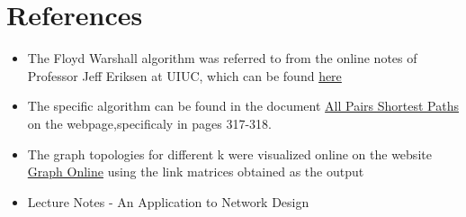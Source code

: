 \documentclass[12pt,letterpaper,titlepage,en-US]{article}
\begin{document}
\section{References}
\begin{itemize}
\item The Floyd Warshall algorithm was referred to from the online notes of Professor Jeff Eriksen at UIUC, which can be found \href{http://jeffe.cs.illinois.edu/teaching/algorithms/}{here}

\item The specific algorithm can be found in the document \href{http://jeffe.cs.illinois.edu/teaching/algorithms/book/09-apsp.pdf}{All Pairs Shortest Paths} on the webpage,specificaly in pages 317-318.

\item The graph topologies for different k were visualized online on the website \href{https://graphonline.ru/en/create_graph_by_matrix}{Graph Online} using the link matrices obtained as the output

\item Lecture Notes - An Application to Network Design
\end{itemize}
\end{document}
